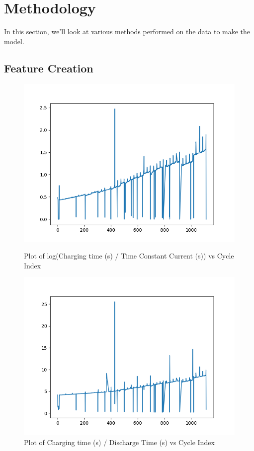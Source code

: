 \documentclass[12pt]{article}
\begin{document}
	\section{Methodology}
	\footnotesize{In this section, we'll look at various methods performed on the data to make the model.}
		\subsection{Feature Creation}
			\begin{figure}[h]
				\centering
				\begin{minipage}{0.45\textwidth}
					\centering
					\includegraphics[width=\textwidth]{imgs/LogChargeToTimeConstCurrentPlt.png}
					\caption{Plot of log(Charging time (s) / Time Constant Current (s)) vs Cycle Index}
					\label{fig:plot1}
				\end{minipage}
				\hfill
				\begin{minipage}{0.45\textwidth}
					\centering
					\includegraphics[width=\textwidth]{imgs/ChargeToDischargePlt.png}
					\caption{Plot of Charging time (s) / Discharge Time (s) vs Cycle Index}
					\label{fig:plot2}
				\end{minipage}
			\end{figure}
\end{document}
